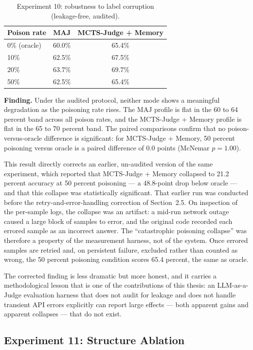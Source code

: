 \documentclass[12pt,a4paper]{report}
\begin{document}
\begin{table}[h]
\centering
\begin{tabular}{lcc}
\toprule
Poison rate & MAJ & MCTS-Judge + Memory \\
\midrule
0\% (oracle) & 60.0\% & 65.4\% \\
10\% & 62.5\% & 67.5\% \\
20\% & 63.7\% & 69.7\% \\
50\% & 62.5\% & 65.4\% \\
\bottomrule
\end{tabular}
\caption{Experiment 10: robustness to label corruption (leakage-free, audited).}
\label{tab:poisoned}
\end{table}

\textbf{Finding.} Under the audited protocol, neither mode shows a meaningful degradation as the poisoning rate rises. The MAJ profile is flat in the 60 to 64 percent band across all poison rates, and the MCTS-Judge + Memory profile is flat in the 65 to 70 percent band. The paired comparisons confirm that no poison-versus-oracle difference is significant: for MCTS-Judge + Memory, 50 percent poisoning versus oracle is a paired difference of $0.0$ points (McNemar $p = 1.00$).

This result directly corrects an earlier, un-audited version of the same experiment, which reported that MCTS-Judge + Memory collapsed to 21.2 percent accuracy at 50 percent poisoning --- a 48.8-point drop below oracle --- and that this collapse was statistically significant. That earlier run was conducted before the retry-and-error-handling correction of Section~2.5. On inspection of the per-sample logs, the collapse was an artifact: a mid-run network outage caused a large block of samples to error, and the original code recorded each errored sample as an incorrect answer. The ``catastrophic poisoning collapse'' was therefore a property of the measurement harness, not of the system. Once errored samples are retried and, on persistent failure, excluded rather than counted as wrong, the 50 percent poisoning condition scores 65.4 percent, the same as oracle.

The corrected finding is less dramatic but more honest, and it carries a methodological lesson that is one of the contributions of this thesis: an LLM-as-a-Judge evaluation harness that does not audit for leakage and does not handle transient API errors explicitly can report large effects --- both apparent gains and apparent collapses --- that do not exist.

\subsection{Experiment 11: Structure Ablation}
\end{document}

